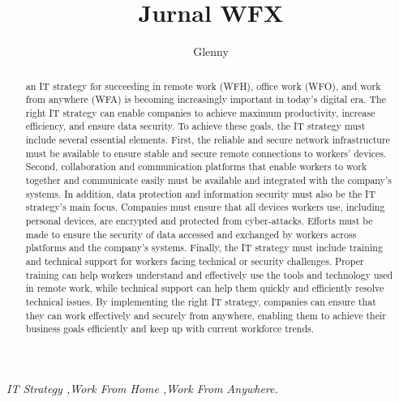 \documentclass[review]{elsarticle}
\begin{document}
\begin{frontmatter}

\title{Jurnal WFX }

\author{Glenny}
\address{Pradita University, Kelapa Dua, Tangerang}




\begin{abstract}
an IT strategy for succeeding in remote work (WFH), office work (WFO), and work from anywhere (WFA) is becoming increasingly important in today's digital era. The right IT strategy can enable companies to achieve maximum productivity, increase efficiency, and ensure data security. To achieve these goals, the IT strategy must include several essential elements. First, the reliable and secure network infrastructure must be available to ensure stable and secure remote connections to workers' devices. Second, collaboration and communication platforms that enable workers to work together and communicate easily must be available and integrated with the company's systems. In addition, data protection and information security must also be the IT strategy's main focus. Companies must ensure that all devices workers use, including personal devices, are encrypted and protected from cyber-attacks. Efforts must be made to ensure the security of data accessed and exchanged by workers across platforms and the company's systems. Finally, the IT strategy must include training and technical support for workers facing technical or security challenges. Proper training can help workers understand and effectively use the tools and technology used in remote work, while technical support can help them quickly and efficiently resolve technical issues. By implementing the right IT strategy, companies can ensure that they can work effectively and securely from anywhere, enabling them to achieve their business goals efficiently and keep up with current workforce trends.

\end{abstract}

\begin{keyword}
\emph{IT Strategy \sep Work From Home \sep Work From Anywhere. }
\end{keyword}

\end{frontmatter}
\end{document}
